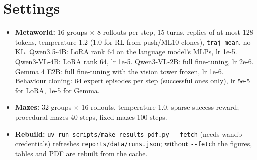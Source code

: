 \documentclass[11pt]{article}
\newcommand{\code}[1]{\texttt{#1}}
\begin{document}
\section{Settings}
\begin{itemize}
\item \textbf{Metaworld:} 16 groups $\times$ 8 rollouts per step, 15 turns, replies of at most 128 tokens, temperature 1.2
  (1.0 for RL from push/ML10 clones), \code{traj\_mean}, no KL. Qwen3.5-4B: LoRA rank 64 on the language model's MLPs,
  lr 1e-5. Qwen3-VL-4B: LoRA rank 64, lr 1e-5. Qwen3-VL-2B: full fine-tuning, lr 2e-6. Gemma 4 E2B: full fine-tuning with
  the vision tower frozen, lr 1e-6. Behaviour cloning: 64 expert episodes per step (successful ones only), lr 5e-5 for
  LoRA, 1e-5 for Gemma.
\item \textbf{Mazes:} 32 groups $\times$ 16 rollouts, temperature 1.0, sparse success reward; procedural mazes 40 steps,
  fixed mazes 100 steps.
\item \textbf{Rebuild:} \code{uv run scripts/make\_results\_pdf.py -{}-fetch} (needs wandb credentials) refreshes
  \code{reports/data/runs.json}; without \code{-{}-fetch} the figures, tables and PDF are rebuilt from the cache.
\end{itemize}
\end{document}
